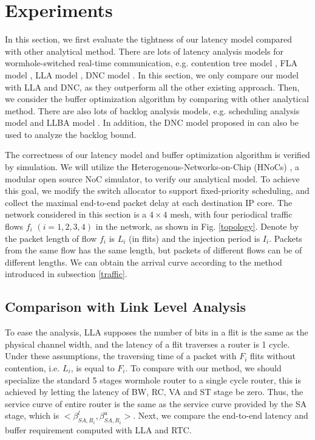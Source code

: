 \documentclass[10pt,journal]{IEEEtran}
\begin{document}
\section{Experiments}\label{experiments}
In this section, we first evaluate the tightness of our latency model compared with other analytical method. There are lots of latency analysis models for wormhole-switched real-time communication, e.g. contention tree model \cite{LuJS05}, FLA model \cite{Shi:2008:RCA:1397757.1397996}, LLA model \cite{73}, DNC model \cite{Qian489900}. In this section, we only compare our model with LLA and DNC, as they outperform all the other existing approach. Then, we consider the buffer optimization algorithm by comparing with other analytical method. There are also lots of backlog analysis models, e.g. scheduling analysis model \cite{Manolache:2006:BSO:1131481.1131683} and LLBA model \cite{189}. In addition, the DNC model proposed in \cite{Qian489900} can also be used to analyze the backlog bound.

The correctness of our latency model and buffer optimization algorithm is verified by simulation. We will utilize the Heterogenous-Networks-on-Chip (HNoCs) \cite{6404157}, a modular open source NoC simulator, to verify our analytical model. To achieve this goal, we modify the switch allocator to support fixed-priority scheduling, and collect the maximal end-to-end packet delay at each destination IP core. The network considered in this section is a $4\times 4$ mesh, with four periodical traffic flows $f_i$ $(i=1,2,3,4)$ in the network, as shown in Fig. \ref{topology}. Denote by the packet length of flow $f_i$ is $L_i$ (in flits) and the injection period is $I_i$. Packets from the same flow has the same length, but packets of different flows can be of different lengths. We can obtain the arrival curve according to the method introduced in subsection \ref{traffic}.

\subsection{Comparison with Link Level Analysis}
To ease the analysis, LLA supposes the number of bits in a flit is the same as the physical channel width, and the latency of a flit traverses a router is 1 cycle. Under these assumptions, the traversing time of a packet with $F_i$ flits without contention, i.e. $L_i$, is equal to $F_i$. To compare with our method, we should specialize the standard 5 stages wormhole router to a single cycle router, this is achieved by letting the latency of BW, RC, VA and ST stage be zero. Thus, the service curve of entire router is the same as the service curve provided by the SA stage, which is $<\beta_{SA,R_i}^l,\beta_{SA,R_i}^u>$. Next, we compare the end-to-end latency and buffer requirement computed with LLA and RTC.
\end{document}
